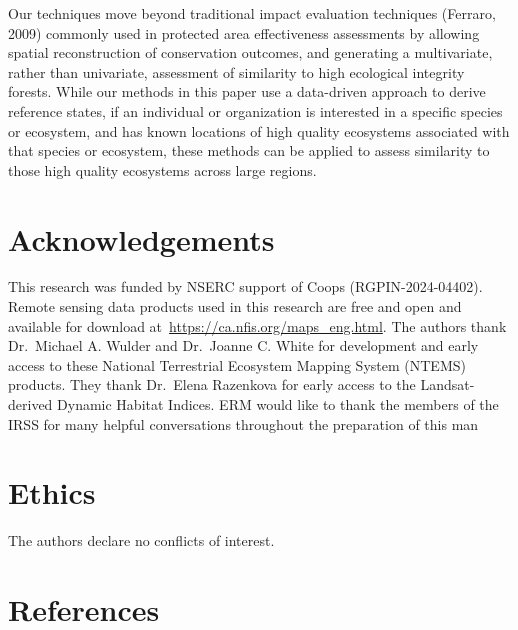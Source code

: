 \documentclass[
]{agujournal2019}
\begin{document}
Our techniques move beyond traditional impact evaluation techniques
(Ferraro, 2009) commonly used in protected area effectiveness
assessments by allowing spatial reconstruction of conservation outcomes,
and generating a multivariate, rather than univariate, assessment of
similarity to high ecological integrity forests. While our methods in
this paper use a data-driven approach to derive reference states, if an
individual or organization is interested in a specific species or
ecosystem, and has known locations of high quality ecosystems associated
with that species or ecosystem, these methods can be applied to assess
similarity to those high quality ecosystems across large regions.

\section{Acknowledgements}\label{acknowledgements}

This research was funded by NSERC support of Coops (RGPIN-2024-04402).
Remote sensing data products used in this research are free and open and
available for download at~\url{https://ca.nfis.org/maps_eng.html}. The
authors thank Dr.~Michael A. Wulder and Dr.~Joanne C. White for
development and early access to these National Terrestrial Ecosystem
Mapping System (NTEMS) products. They thank Dr.~Elena Razenkova for
early access to the Landsat-derived Dynamic Habitat Indices. ERM would
like to thank the members of the IRSS for many helpful conversations
throughout the preparation of this man

\section{Ethics}\label{ethics}

The authors declare no conflicts of interest.

\section*{References}\label{references}
\end{document}
